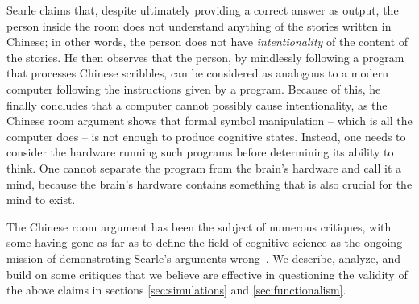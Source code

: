 Searle claims that, despite ultimately providing a correct answer as output, the person inside the room does not understand anything of the stories written in Chinese; in other words, the person does not have \textit{intentionality} of the content of the stories. He then observes that the person, by mindlessly following a program that processes Chinese scribbles, can be considered as analogous to a modern computer following the instructions given by a program. Because of this, he finally concludes that a computer cannot possibly cause intentionality, as the Chinese room argument shows that formal symbol manipulation – which is all the computer does – is not enough to produce cognitive states. Instead, one needs to consider the hardware running such programs before determining its ability to think. One cannot separate the program from the brain's hardware and call it a mind, because the brain's hardware contains something that is also crucial for the mind to exist.

The Chinese room argument has been the subject of numerous critiques, with some having gone as far as to define the field of cognitive science as the ongoing mission of demonstrating Searle's arguments wrong~\cite{lucas1982proceedings}. We describe, analyze, and build on some critiques that we believe are effective in questioning the validity of the above claims in sections \ref{sec:simulations} and \ref{sec:functionalism}.
